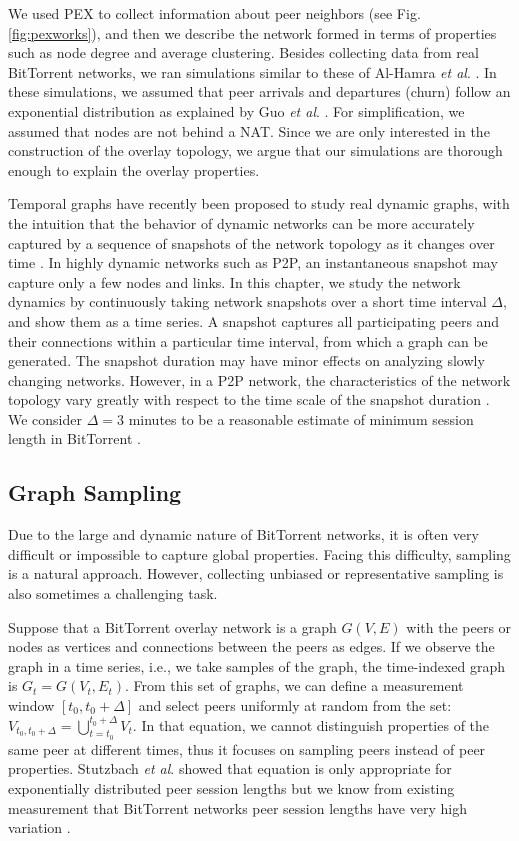 We used PEX to collect information about peer neighbors (see Fig.\ref{fig:pexworks}), and then we describe the network formed in terms of properties such as node degree and average clustering. 
Besides collecting data from real BitTorrent networks, we ran simulations similar to these of Al-Hamra \textit{et al}. \cite{al2009swarming}. 
In these simulations, we assumed that peer arrivals and departures (churn) follow an exponential distribution as explained by Guo \textit{et al}. \cite{guo2005measurements}. 
For simplification, we assumed that nodes are not behind a NAT.
Since we are only interested in the construction of the overlay topology, we argue that our simulations are thorough enough to explain the overlay properties.

Temporal graphs have recently been proposed to study real dynamic graphs, with the intuition that the behavior of dynamic networks can be more accurately captured by a sequence of snapshots of the network topology as it changes over time \cite{grindodevolvingnet}\cite{Tang2009}.
In highly dynamic networks such as P2P, an instantaneous snapshot may capture only a few nodes and links. 
In this chapter, we study the network dynamics by continuously taking network snapshots over a short time interval $\Delta$, and show them as a time series.
A snapshot captures all participating peers and their connections within a particular time interval, from which a graph can be generated.
The snapshot duration may have minor effects on analyzing slowly changing networks.
However, in a P2P network, the characteristics of the network topology vary greatly with respect to the time scale of the snapshot duration \cite{stutzbach2008characterizing}.
We consider $\Delta=3 $ minutes to be a reasonable estimate of minimum session length in BitTorrent \cite{stutzbach2006understanding}. 

\subsection{Graph Sampling}\label{sec:graphsampling}
Due to the large and dynamic nature of BitTorrent networks, it is often very difficult or impossible to capture global properties. 
Facing this difficulty, sampling is a natural approach.
However, collecting unbiased or representative sampling is also sometimes a challenging task.

Suppose that a BitTorrent overlay network is a graph $G(V,E)$ with the peers or nodes as vertices and connections between the peers as edges. 
If we observe the graph in a time series,  i.e., we take samples of the graph, the time-indexed graph is $G_t = G(V_t,E_t)$.   
From this set of graphs, we can define a measurement window $[t_0,t_0 + \Delta]$ and select peers uniformly at random from the set: $V_{t_0,t_0+\Delta}=\bigcup^{t_0+\Delta}_{t=t_0} V_t$.
In that equation, we cannot distinguish properties of the same peer at different times, thus it focuses on sampling peers instead of peer properties. 
Stutzbach \textit{et al}. \cite{stutzbach2007sampling} showed that equation is only appropriate for exponentially distributed  peer session lengths but we know from existing measurement that BitTorrent networks peer session lengths have very high variation \cite{guo2005measurements}. 

